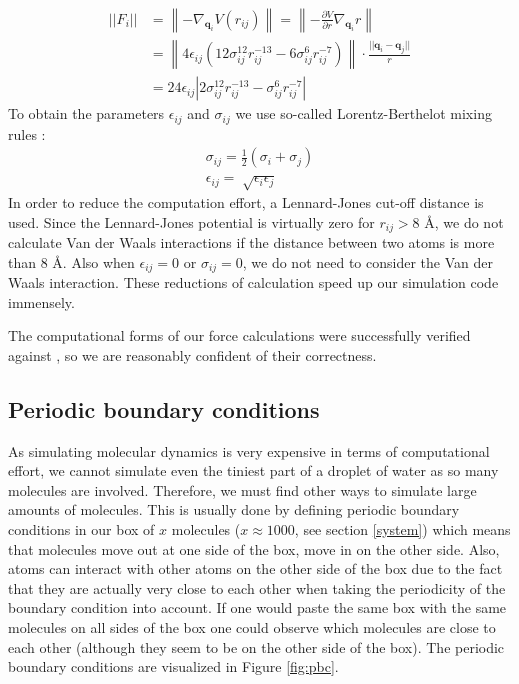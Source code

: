\documentclass[11pt,a4paper]{article}
\begin{document}
\begin{align*}
||F_i|| &= \left\|-\nabla_{\textbf{q}_i}V(r_{ij})\right\| = \left\|-\frac{\partial V}{\partial r}\nabla_{\textbf{q}_i}r\right\| \\
&= \left\|4\epsilon_{ij}\left(12\sigma_{ij}^{12}r_{ij}^{-13} - 6\sigma_{ij}^{6}r_{ij}^{-7}\right)\right\|\cdot \frac{||\textbf{q}_i - \textbf{q}_j||}{r} \\
&= 24\epsilon_{ij}\left|2\sigma_{ij}^{12}r_{ij}^{-13} - \sigma_{ij}^{6}r_{ij}^{-7}\right|
\end{align*}
To obtain the parameters $\epsilon_{ij}$ and $\sigma_{ij}$ we use so-called Lorentz-Berthelot mixing rules \cite{delhommelle2001inadequacy}:
\begin{align*}
\sigma_{ij} = \frac{1}{2}\left(\sigma_i + \sigma_j\right) \\
\epsilon_{ij} = \sqrt[]{\epsilon_i \epsilon_j}
\end{align*}
In order to reduce the computation effort, a Lennard-Jones cut-off distance is used. Since the Lennard-Jones potential is virtually zero for $r_{ij} > 8$ \r{A}, we do not calculate Van der Waals interactions if the distance between two atoms is more than 8 \r{A}. Also when $\epsilon_{ij} = 0$ or $\sigma_{ij} = 0$, we do not need to consider the Van der Waals interaction. These reductions of calculation speed up our simulation code immensely. 

The computational forms of our force calculations were successfully verified against \cite{hal}, so we are reasonably confident of their correctness.


\subsection{Periodic boundary conditions}
\label{pbc} %
As simulating molecular dynamics is very expensive in terms of computational effort, we cannot simulate even the tiniest part of a droplet of water as so many molecules are involved. Therefore, we must find other ways to simulate large amounts of molecules. This is usually done by defining periodic boundary conditions in our box of $x$ molecules ($x \approx 1000$, see section \ref{system}) which means that molecules move out at one side of the box, move in on the other side. Also, atoms can interact with other atoms on the other side of the box due to the fact that they are actually very close to each other when taking the periodicity of the boundary condition into account. If one would paste the same box with the same molecules on all sides of the box one could observe which molecules are close to each other (although they seem to be on the other side of the box). The periodic boundary conditions are visualized in Figure \ref{fig:pbc}.
\end{document}
